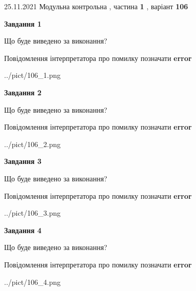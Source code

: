 \documentclass[10pt, ukrainian]{article}
\begin{document}
{25.11.2021 Модульна контрольна , частина \textbf { 1 }, варіант  \No \textbf { 106 }\par}
{
\begin {large}

{\begin {center}\textbf{Завдання 1}\end {center}}\par
Що буде виведено за виконання? \par
Повідомлення інтерпретатора про помилку позначати \textbf{error}

\begin{center}
	{../pict/106_1.png}
\end{center}
\newpage

{\begin {center}\textbf{Завдання 2}\end {center}}\par
Що буде виведено за виконання? \par
Повідомлення інтерпретатора про помилку позначати \textbf{error}

\begin{center}
	{../pict/106_2.png}
\end{center}
\newpage

{\begin {center}\textbf{Завдання 3}\end {center}}\par
Що буде виведено за виконання? \par
Повідомлення інтерпретатора про помилку позначати \textbf{error}

\begin{center}
	{../pict/106_3.png}
\end{center}
\newpage

{\begin {center}\textbf{Завдання 4}\end {center}}\par
Що буде виведено за виконання? \par
Повідомлення інтерпретатора про помилку позначати \textbf{error}

\begin{center}
	{../pict/106_4.png}
\end{center}
\newpage


\end{large}}
\end{document}

